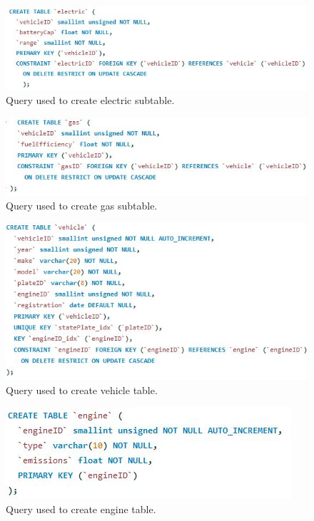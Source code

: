\documentclass[12pt,letterpaper]{article}
\begin{document}
	\pagebreak
	\begin{figure}[ht]  
		\begin{center}
			\includegraphics[width=\textwidth]{electric.jpg}
		\end{center}
		\caption{\label{electric} Query used to create electric subtable.}
	\end{figure}
	\pagebreak
	\begin{figure}[ht]  
		\begin{center}
			\includegraphics[width=\textwidth]{gas.jpg}
		\end{center}
		\caption{\label{gas} Query used to create gas subtable.}
	\end{figure}
	\pagebreak
	\begin{figure}[ht]  
		\begin{center}
			\includegraphics[width=\textwidth]{vehicle.jpg}
		\end{center}
		\caption{\label{vehicle} Query used to create vehicle table.}
	\end{figure}
	\pagebreak
	\begin{figure}[ht]  
		\begin{center}
			\includegraphics[width=\textwidth]{engine.jpg}
		\end{center}
		\caption{\label{engine} Query used to create engine table.}
	\end{figure}
\end{document}
